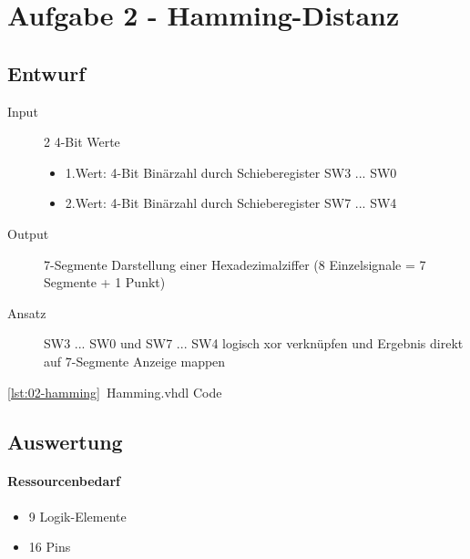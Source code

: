 \section{Aufgabe 2 - Hamming-Distanz}
\subsection{Entwurf}
\begin{description}
	\item[Input] 2 4-Bit Werte 
		\begin{itemize}
			\item 1.Wert: 4-Bit Binärzahl durch Schieberegister SW3 ... SW0
			\item 2.Wert: 4-Bit Binärzahl durch Schieberegister SW7 ... SW4
		\end{itemize}
	\item[Output] 7-Segmente Darstellung einer Hexadezimalziffer (8 Einzelsignale = 7 Segmente + 1 Punkt)
	\item[Ansatz] SW3 ... SW0 und SW7 ... SW4 logisch xor verknüpfen und Ergebnis direkt auf 7-Segmente Anzeige mappen
\end{description}	
\ref{lst:02-hamming}~Hamming.vhdl Code

\subsection{Auswertung}
\paragraph{Ressourcenbedarf}
\begin{itemize} 
\item 9 Logik-Elemente
\item 16 Pins 
\end{itemize}
